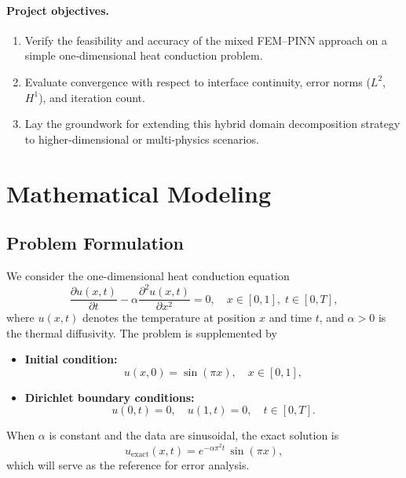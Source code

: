 \documentclass[12pt]{article}
\begin{document}
\paragraph{Project objectives.}
\begin{enumerate}
  \item Verify the feasibility and accuracy of the mixed FEM–PINN approach on a simple one‐dimensional heat conduction problem.
  \item Evaluate convergence with respect to interface continuity, error norms ($L^2$, $H^1$), and iteration count.
  \item Lay the groundwork for extending this hybrid domain decomposition strategy to higher‐dimensional or multi‐physics scenarios.
\end{enumerate}

\section{Mathematical Modeling}

\subsection{Problem Formulation}

We consider the one-dimensional heat conduction equation
\begin{equation}
  \frac{\partial u(x,t)}{\partial t}
  - \alpha \frac{\partial^2 u(x,t)}{\partial x^2} = 0,
  \quad x \in [0,1],\; t \in [0,T],
\end{equation}
where \(u(x,t)\) denotes the temperature at position \(x\) and time \(t\),
and \(\alpha>0\) is the thermal diffusivity.  The problem is supplemented by
\begin{itemize}
  \item \textbf{Initial condition:}
  \begin{equation}
    u(x,0) = \sin(\pi x),
    \quad x\in[0,1],
  \end{equation}
  \item \textbf{Dirichlet boundary conditions:}
  \begin{equation}
    u(0,t) = 0,\quad u(1,t) = 0,
    \quad t\in[0,T].
  \end{equation}
\end{itemize}
When \(\alpha\) is constant and the data are sinusoidal, the exact solution is
\begin{equation}
  u_{\mathrm{exact}}(x,t)
  = e^{-\alpha \pi^2 t}\,\sin(\pi x),
\end{equation}
which will serve as the reference for error analysis\cite{thomee_galerkin_2007}.
\end{document}
